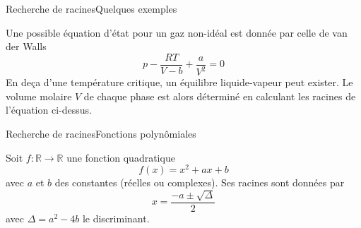 \documentclass[usenames,dvipsnames,svgnames,10pt,aspectratio=169]{beamer}
\begin{document}
\begin{frame}[t, c]{Recherche de racines}{Quelques exemples}
  \begin{minipage}{.68\textwidth}
    Une possible équation d'état pour un gaz non-idéal est donnée par celle de van der Walls
    \[
    p - \dfrac{RT}{V-b} + \dfrac{a}{V^2} = 0
    \]
    En deça d'une température critique, un équilibre liquide-vapeur peut exister.
    Le volume molaire $V$ de chaque phase est alors déterminé en calculant les racines de l'équation ci-dessus.
  \end{minipage}%
  \hfill
  \begin{minipage}{.28\textwidth}
    \centering
  \end{minipage}

  \vspace{1cm}
\end{frame}


\begin{frame}[t, c]{Recherche de racines}{Fonctions polynômiales}
  \begin{minipage}{.68\textwidth}
    Soit $f : \mathbb{R} \to \mathbb{R}$ une fonction quadratique
    \[
    f(x) = x^2 + ax + b
    \]
    avec $a$ et $b$ des constantes (réelles ou complexes).
    Ses racines sont données par
    \[
    x = \dfrac{-a \pm \sqrt{\Delta}}{2}
    \]
    avec $\Delta = a^2 - 4b$ le discriminant.
  \end{minipage}%
  \hfill
  \begin{minipage}{.28\textwidth}
    \centering
  \end{minipage}

  \vspace{1cm}
\end{frame}
\end{document}
